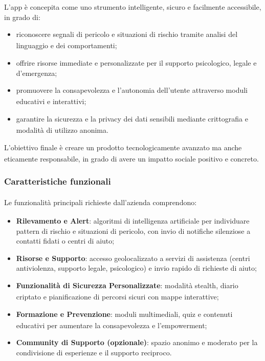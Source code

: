 \documentclass[a4paper,11pt]{article}
\begin{document}
L'app è concepita come uno strumento intelligente, sicuro e facilmente accessibile, in grado di:
\begin{itemize}
  \item riconoscere segnali di pericolo e situazioni di rischio\textsubscript{} tramite analisi del linguaggio e dei comportamenti;
  \item offrire risorse immediate e personalizzate per il supporto psicologico, legale e d'emergenza;
  \item promuovere la consapevolezza e l'autonomia dell'utente attraverso moduli\textsubscript{} educativi e interattivi;
  \item garantire la sicurezza\textsubscript{} e la privacy dei dati sensibili mediante crittografia e modalità di utilizzo anonima.
\end{itemize}
L'obiettivo finale è creare un prodotto\textsubscript{} tecnologicamente avanzato ma anche eticamente responsabile, in grado di avere un impatto sociale positivo e concreto.

\subsubsection{Caratteristiche funzionali\textsubscript{}
}
Le funzionalità\textsubscript{}
 principali richieste dall'azienda comprendono:
\begin{itemize}
  \item \textbf{Rilevamento e Alert}: algoritmi di intelligenza artificiale per individuare pattern di rischio e situazioni di pericolo, con invio di notifiche silenziose a contatti fidati o centri di aiuto;
  \item \textbf{Risorse e Supporto}: accesso geolocalizzato a servizi di assistenza (centri antiviolenza, supporto legale, psicologico) e invio rapido di richieste di aiuto;
  \item \textbf{Funzionalità\textsubscript{}
 di Sicurezza\textsubscript{} Personalizzate}: modalità stealth, diario criptato e pianificazione di percorsi sicuri con mappe interattive;
  \item \textbf{Formazione e Prevenzione}: moduli\textsubscript{} multimediali, quiz e contenuti educativi per aumentare la consapevolezza e l'empowerment;
  \item \textbf{Community di Supporto (opzionale)}: spazio anonimo e moderato per la condivisione di esperienze e il supporto reciproco.
\end{itemize}
\end{document}
